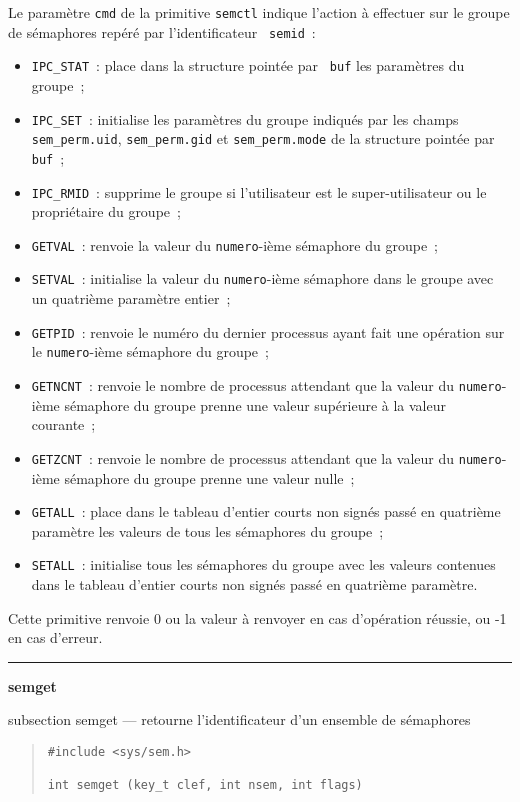 \documentclass [twoside] {report}
\newcommand {\primitive} [1]
    {
	{\large \bf #1}
	\addcontentsline {toc} {subsection} {#1}
    }
\newcommand {\separation}
    {
	\vspace {7mm}
	\nopagebreak
	\hrule
    }
\begin{document}
Le paramètre {\tt cmd} de la primitive {\tt semctl} indique l'action à
effectuer sur le groupe de sémaphores repéré par l'identificateur {\tt
semid}~:

\begin {itemize}
    \item {\tt IPC\_STAT}~: place dans la structure pointée par {\tt
	buf} les paramètres du groupe~;
    \item {\tt IPC\_SET}~: initialise les paramètres du groupe
	indiqués par les champs {\tt sem\_perm.uid}, {\tt sem\_perm.gid}
	et {\tt sem\_perm.mode} de la structure pointée par {\tt buf}~;
    \item {\tt IPC\_RMID}~: supprime le groupe si l'utilisateur est le
	super-utilisateur ou le propriétaire du groupe~;
    \item {\tt GETVAL}~:  renvoie la valeur du {\tt numero}-ième
	sémaphore du groupe~;
    \item {\tt SETVAL}~: initialise la valeur du {\tt numero}-ième
	sémaphore dans le groupe avec un quatrième paramètre entier~;
    \item {\tt GETPID}~: renvoie le numéro du dernier processus ayant
	fait une opération sur le {\tt numero}-ième sémaphore du
	groupe~;
    \item {\tt GETNCNT}~: renvoie le nombre de processus attendant que
	la valeur du {\tt numero}-ième sémaphore du groupe prenne une
	valeur supérieure à la valeur courante~;
    \item {\tt GETZCNT}~: renvoie le nombre de processus attendant que
	la valeur du {\tt numero}-ième sémaphore du groupe prenne une
	valeur nulle~;
    \item {\tt GETALL}~: place dans le tableau d'entier courts non
	signés passé en quatrième paramètre les valeurs de tous les
	sémaphores du groupe~;
    \item {\tt SETALL}~: initialise tous les sémaphores du groupe avec
	les valeurs contenues dans le tableau d'entier courts non
	signés passé en quatrième paramètre.
\end {itemize}

Cette primitive renvoie 0 ou la valeur à renvoyer en cas d'opération
réussie, ou -1 en cas d'erreur.


\separation
\primitive {semget} --- retourne l'identificateur d'un ensemble de sémaphores

\begin {quote}
\begin {verbatim}
#include <sys/sem.h>

int semget (key_t clef, int nsem, int flags)
\end{verbatim}
\end {quote}
\end{document}
